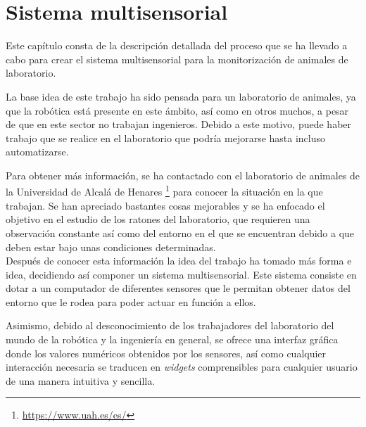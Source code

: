 \chapter{Sistema multisensorial }
\label{cap:capitulo4}



\vspace{1cm}
Este capítulo consta de la descripción detallada del proceso que se ha llevado a cabo para crear el sistema multisensorial para la monitorización de animales de laboratorio. 

La base idea de este trabajo ha sido pensada para un laboratorio de animales, ya que la robótica está presente en este ámbito, así como en otros muchos, a pesar de que en este sector no trabajan ingenieros. Debido a este motivo, puede haber trabajo que se realice en el laboratorio que podría mejorarse hasta incluso automatizarse. 

Para obtener más información, se ha contactado con el laboratorio de animales de la Universidad de Alcalá de Henares \footnote{\url{https://www.uah.es/es/}}  para conocer la situación en la que trabajan. Se han apreciado bastantes cosas mejorables y se ha enfocado el objetivo en el estudio de los ratones del laboratorio, que requieren una observación constante así como del entorno en el que se encuentran debido a que deben estar bajo unas condiciones determinadas.\\

Después de conocer esta información la idea del trabajo ha tomado más forma e idea, decidiendo así componer un sistema multisensorial. Este sistema consiste en dotar a un computador de diferentes sensores que le permitan obtener datos del entorno que le rodea para poder actuar en función a ellos. 

Asimismo, debido al desconocimiento de los trabajadores del laboratorio del mundo de la robótica y la ingeniería en general, se ofrece una interfaz gráfica donde los valores numéricos obtenidos por los sensores, así como cualquier interacción necesaria se traducen en \textit{widgets} comprensibles para cualquier usuario de una manera intuitiva y sencilla.\\

